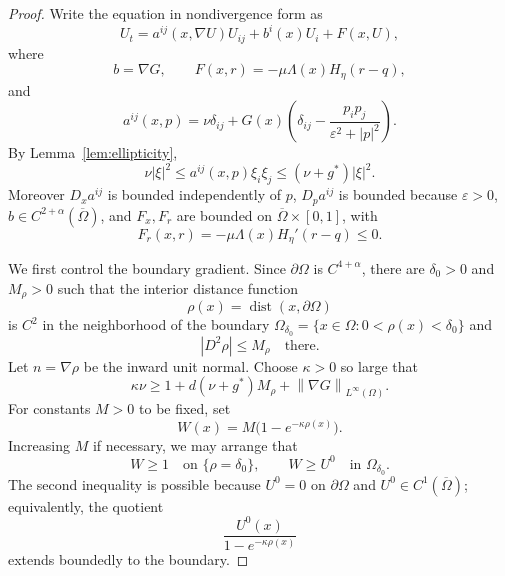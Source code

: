 \documentclass[10pt,a4paper]{amsart}
\newcommand{\eps}{\varepsilon}
\newcommand{\norm}[1]{\left\lVert #1\right\rVert}
\newcommand{\nupar}{\nu}
\begin{document}
\begin{proof}
Write the equation in nondivergence form as
\begin{equation}\label{eq:tailored-gradient-pde}
        U_t=a^{ij}(x,\nabla U)U_{ij}+b^i(x)U_i+F(x,U),
\end{equation}
where
\[
        b=\nabla G,
        \qquad
        F(x,r)=-\mu\Lambda(x)H_\eta(r-q),
\]
and
\[
        a^{ij}(x,p)=\nupar\delta_{ij}
        +G(x)\left(\delta_{ij}-\frac{p_i p_j}{\eps^2+|p|^2}\right).
\]
By Lemma~\ref{lem:ellipticity},
\[
        \nupar|\xi|^2\le a^{ij}(x,p)\xi_i\xi_j
        \le (\nupar+g^*)|\xi|^2.
\]
Moreover $D_xa^{ij}$ is bounded independently of $p$, $D_p a^{ij}$ is bounded because $\eps>0$, $b\in C^{2+\alpha}(\overline\Omega)$, and $F_x,F_r$ are bounded on $\overline\Omega\times[0,1]$, with
\[
        F_r(x,r)=-\mu\Lambda(x)H_\eta'(r-q)\le0.
\]

We first control the boundary gradient.  Since $\partial\Omega$ is $C^{4+\alpha}$, there are $\delta_0>0$ and $M_\rho>0$ such that the interior distance function
\[
        \rho(x)=\operatorname{dist}(x,\partial\Omega)
\]
is $C^2$ in the neighborhood of the boundary $\Omega_{\delta_0}=\{x\in\Omega:0<\rho(x)<\delta_0\}$ and
\[
        |D^2\rho|\le M_\rho \quad\text{there}.
\]
Let $n=\nabla\rho$ be the inward unit normal.  Choose $\kappa>0$ so large that
\[
        \kappa\nupar
        \ge
        1+d(\nupar+g^*)M_\rho+\norm{\nabla G}_{L^\infty(\Omega)}.
\]
For constants $M>0$ to be fixed, set
\[
        W(x)=M\bigl(1-e^{-\kappa\rho(x)}\bigr).
\]
Increasing $M$ if necessary, we may arrange that
\[
        W\ge1 \quad\text{on } \{\rho=\delta_0\},
        \qquad
        W\ge U^0 \quad\text{in } \Omega_{\delta_0}.
\]
The second inequality is possible because $U^0=0$ on $\partial\Omega$ and $U^0\in C^1(\overline\Omega)$; equivalently, the quotient
\[
        \frac{U^0(x)}{1-e^{-\kappa\rho(x)}}
\]
extends boundedly to the boundary.


\end{proof}
\end{document}
